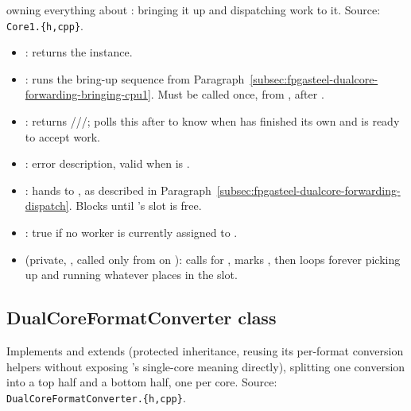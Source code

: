  owning everything about : bringing it up and dispatching work to it. Source: \lstinline[style=inlineFsRepo]!Core1.{h,cpp}!.

\begin{itemize}
 \item {}: returns the  instance.
 \item {}: runs the bring-up sequence from Paragraph~\ref{subsec:fpgasteel-dualcore-forwarding-bringing-cpu1}. Must be called once, from , after .
 \item {}: returns ///;  polls this after  to know when  has finished its own  and is ready to accept work.
 \item {}: error description, valid when  is .
 \item {}: hands  to , as described in Paragraph~\ref{subsec:fpgasteel-dualcore-forwarding-dispatch}. Blocks until 's slot is free.
 \item {}: true if no worker is currently assigned to .
 \item {} (private, , called only from  on ): calls  for , marks  , then loops forever picking up and running whatever  places in the slot.
\end{itemize}

\subsection{DualCoreFormatConverter class}
\label{subsec:fpgasteel-dualcore-forwarding-dualcore-format-converter}

Implements  and extends  (protected inheritance, reusing its per-format conversion helpers without exposing 's single-core meaning directly), splitting one conversion into a top half and a bottom half, one per core. Source: \lstinline[style=inlineFsRepo]!DualCoreFormatConverter.{h,cpp}!.


